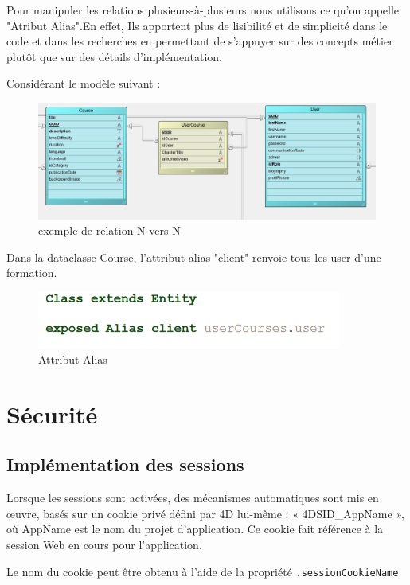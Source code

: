 Pour manipuler les relations plusieurs-à-plusieurs nous utilisons ce qu'on appelle "Atribut Alias".En effet, Ils apportent plus de lisibilité et de simplicité dans le code et dans les recherches en permettant de s'appuyer sur des concepts métier plutôt que sur des détails d'implémentation.

Considérant le modèle suivant :

\begin{figure}[H]
    \centering
\includegraphics[width=19cm]{Figures/exemple.PNG}
    \caption{exemple de relation N vers N}
\end{figure}

Dans la dataclasse Course, l'attribut alias "client" renvoie tous les user d'une formation.

\begin{figure}[H]
    \centering
\includegraphics[width=10cm]{Figures/alias.PNG}
    \caption{Attribut Alias}
\end{figure}

\section{Sécurité}

\subsection{Implémentation des sessions}
Lorsque les sessions sont activées, des mécanismes automatiques sont mis en œuvre, basés sur un cookie privé défini par 4D lui-même : « 4DSID\_AppName », où AppName est le nom du projet d'application. Ce cookie fait référence à la session Web en cours pour l'application. 

Le nom du cookie peut être obtenu à l'aide de la propriété \texttt{.sessionCookieName}.



